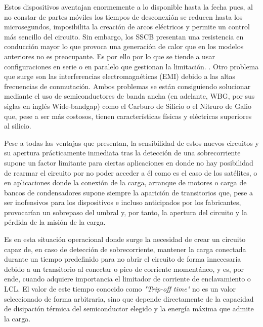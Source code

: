 \documentclass[12pt]{report} %
\begin{document}
Estos dispositivos aventajan enormemente a lo disponible hasta la fecha pues, al no constar de partes móviles los tiempos de desconexión se reducen hasta los microsegundos, imposibilita la creación de arcos eléctricos y permite un control más sencillo del circuito. Sin embargo, los SSCB presentan una resistencia en conducción mayor lo que provoca una generación de calor que en los modelos anteriores no es preocupante. Es por ello por lo que se tiende a usar configuraciones en serie o en paralelo que gestionan la limitación. \cite{onsemi_solid-state_nodate}. Otro problema que surge son las interferencias electromagnéticas (EMI) debido a las altas frecuencias de conmutación. 
Ambos problemas se están consiguiendo solucionar mediante el uso de semiconductores de banda ancha (en adelante, WBG, por sus siglas en inglés Wide-bandgap) como el Carburo de Silicio o el Nitruro de Galio que, pese a ser más costosos, tienen características físicas y eléctricas superiores al silicio. \cite{stmicroelectronics_solid_nodate}

Pese a todas las ventajas que presentan, la sensibilidad de estos nuevos circuitos y su apertura prácticamente inmediata tras la detección de una sobrecorriente supone un factor limitante para ciertas aplicaciones en donde no hay posibilidad de rearmar el circuito por no poder acceder a él como es el caso de los satélites, o en aplicaciones donde la conexión de la carga, arranque de motores o carga de bancos de condensadores supone siempre la aparición de transitorios que, pese a ser inofensivos para los dispositivos e incluso anticipados por los fabricantes, provocarían un sobrepaso del umbral y, por tanto, la apertura del circuito y la pérdida de la misión de la carga. 

Es en esta situación operacional donde surge la necesidad de crear un circuito capaz de, en caso de detección de sobrecorriente, mantener la carga conectada durante un tiempo predefinido para no abrir el circuito de forma innecesaria debido a un transitorio al conectar o pico de corriente momentáneo, y es, por ende, cuando adquiere importancia el limitador de corriente de enclavamiento o LCL. El valor de este tiempo conocido como \textit{"Trip-off time"} no es un valor seleccionado de forma arbitraria, sino que depende directamente de la capacidad de disipación térmica del semiconductor elegido y la energía máxima que admite la carga.
\end{document}
